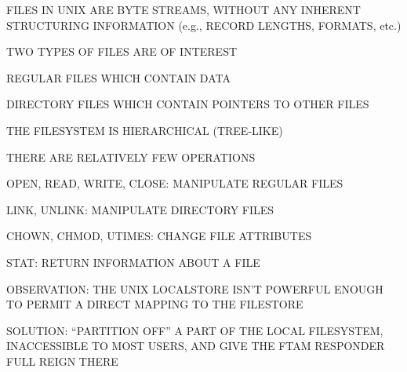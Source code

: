 \begin{bwslide}

\begin{nrtc}
\item	FILES IN UNIX ARE BYTE STREAMS, WITHOUT ANY INHERENT STRUCTURING
	INFORMATION (e.g., RECORD LENGTHS, FORMATS, etc.)

\item	TWO TYPES OF FILES ARE OF INTEREST
    \begin{nrtc}
    \item	REGULAR FILES WHICH CONTAIN DATA

    \item	DIRECTORY FILES WHICH CONTAIN POINTERS TO OTHER FILES
    \end{nrtc}

\item	THE FILESYSTEM IS HIERARCHICAL (TREE-LIKE)

\item	THERE ARE RELATIVELY FEW OPERATIONS
    \begin{nrtc}
    \item	OPEN, READ, WRITE, CLOSE: MANIPULATE REGULAR FILES

    \item	LINK, UNLINK: MANIPULATE DIRECTORY FILES

    \item	CHOWN, CHMOD, UTIMES: CHANGE FILE ATTRIBUTES

    \item	STAT: RETURN INFORMATION ABOUT A FILE
    \end{nrtc}
\end{nrtc}
\end{bwslide}


\begin{bwslide}

\begin{nrtc}
\item	OBSERVATION: THE UNIX LOCALSTORE ISN'T POWERFUL ENOUGH TO PERMIT
	A DIRECT MAPPING TO THE FILESTORE

\item	SOLUTION: ``PARTITION OFF'' A PART OF THE LOCAL FILESYSTEM,
	INACCESSIBLE TO MOST USERS, AND GIVE THE FTAM RESPONDER FULL REIGN
	THERE
\end{nrtc}
\end{bwslide}


